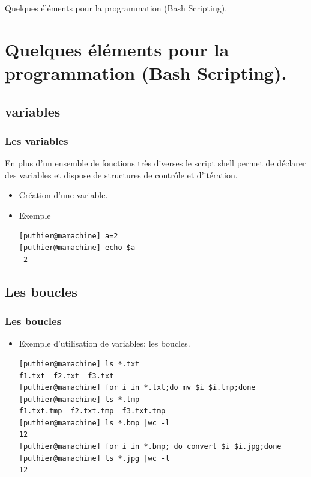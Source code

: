 \documentclass[10pt, xcolor=dvipsnames]{beamer}
\begin{document}
\frame
{
\begin{block}{}
\begin{center}
\begin{huge}
Quelques éléments pour la programmation (Bash Scripting).
\end{huge}
\end{center}
\end{block}

}



\section{Quelques éléments pour la programmation (Bash Scripting).}

\subsection{variables}

\begin{frame}[fragile]
 \frametitle{Les variables}

En plus d'un ensemble de fonctions très diverses le script shell permet de déclarer des variables et dispose de structures de contrôle et d'itération.
    \begin{itemize}
    \item Création d'une variable.
    \item Exemple 
             \begin{verbatim}
[puthier@mamachine] a=2
[puthier@mamachine] echo $a
 2
             \end{verbatim}
    \end{itemize}

\end{frame}

\subsection{Les boucles}
\begin{frame}[fragile]
 \frametitle{Les boucles}

    \begin{itemize}
    \item Exemple d'utilisation de variables: les boucles.
          \begin{scriptsize}
             \begin{verbatim}
[puthier@mamachine] ls *.txt
f1.txt  f2.txt  f3.txt
[puthier@mamachine] for i in *.txt;do mv $i $i.tmp;done
[puthier@mamachine] ls *.tmp
f1.txt.tmp  f2.txt.tmp  f3.txt.tmp
[puthier@mamachine] ls *.bmp |wc -l
12
[puthier@mamachine] for i in *.bmp; do convert $i $i.jpg;done 
[puthier@mamachine] ls *.jpg |wc -l
12

             \end{verbatim}
        \end{scriptsize}
    \end{itemize}
\end{frame}
\end{document}
